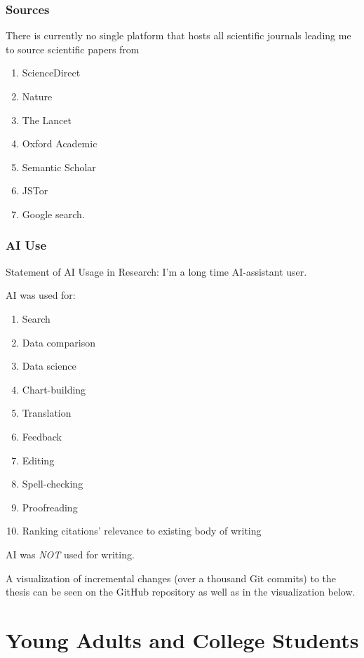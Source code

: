 \documentclass[
  12pt,
  letterpaper,
  DIV=11,
  numbers=noendperiod]{scrartcl}
\providecommand{\tightlist}{%
  \setlength{\itemsep}{0pt}\setlength{\parskip}{0pt}}
\begin{document}
\subsubsection{Sources}\label{sources}

There is currently no single platform that hosts all scientific journals
leading me to source scientific papers from

\begin{enumerate}
\def\labelenumi{\arabic{enumi}.}
\tightlist
\item
  ScienceDirect
\item
  Nature
\item
  The Lancet
\item
  Oxford Academic
\item
  Semantic Scholar
\item
  JSTor
\item
  Google search.
\end{enumerate}

\subsubsection{AI Use}\label{ai-use}

Statement of AI Usage in Research: I'm a long time AI-assistant user.

AI was used for:

\begin{enumerate}
\def\labelenumi{\arabic{enumi}.}
\tightlist
\item
  Search
\item
  Data comparison
\item
  Data science
\item
  Chart-building
\item
  Translation
\item
  Feedback
\item
  Editing
\item
  Spell-checking
\item
  Proofreading
\item
  Ranking citations' relevance to existing body of writing
\end{enumerate}

AI was \emph{NOT} used for writing.

A visualization of incremental changes (over a thousand Git commits) to
the thesis can be seen on the GitHub repository as well as in the
visualization below.

\newpage

\section{Young Adults and College
Students}\label{young-adults-and-college-students}
\end{document}
